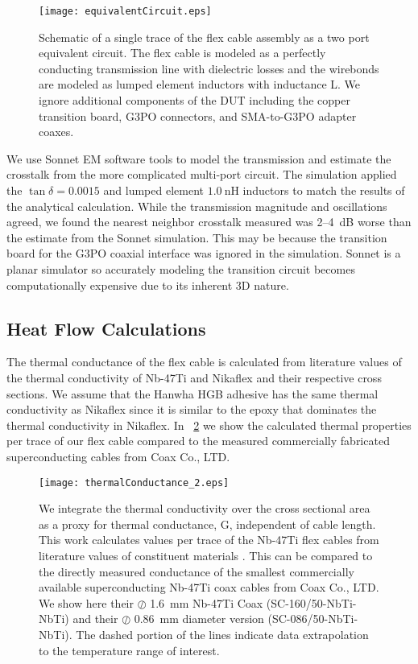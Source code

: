 \begin{figure}[!t]
    \centering
      \texttt{[image: equivalentCircuit.eps]}
    \caption[Equivalent circuit for flex cable]{Schematic of a single trace of the flex cable assembly as a two port equivalent circuit. The flex cable is modeled as a perfectly conducting transmission line with dielectric losses and the wirebonds are modeled as lumped element inductors with inductance L. We ignore additional components of the DUT including the copper transition board, G3PO connectors, and SMA-to-G3PO adapter coaxes.}
    \label{fig:Circuit}
\end{figure}

We use Sonnet EM software tools to model the transmission and estimate the crosstalk from the more complicated multi-port circuit. The simulation applied the $\tan{\delta} =0.0015$ and lumped element $1.0~\textrm{nH}$ inductors to match the results of the analytical calculation. While the transmission magnitude and oscillations agreed, we found the nearest neighbor crosstalk measured was 2--4~dB worse than the estimate from the Sonnet simulation. This may be because the transition board for the G3PO coaxial interface was ignored in the simulation. Sonnet is a planar simulator so accurately modeling the transition circuit becomes computationally expensive due to its inherent 3D nature. 

\subsection{Heat Flow Calculations} \label{sec:thermal}
The thermal conductance of the flex cable is calculated from literature values of the thermal conductivity of Nb-47Ti \parencite{DaalInPrep, Olson1993} and Nikaflex \parencite{Kellaris} and their respective cross sections. We assume that the Hanwha HGB adhesive has the same thermal conductivity as Nikaflex since it is similar to the epoxy that dominates the thermal conductivity in Nikaflex. In \figurename~\ref{fig:Heat} we show the calculated thermal properties per trace of our flex cable compared to the measured commercially fabricated superconducting cables from Coax Co., LTD. 

\begin{figure}[!t]
    \centering
      \texttt{[image: thermalConductance\_2.eps]}
    \caption[Thermal conductivity of flex cable]{We integrate the thermal conductivity over the cross sectional area as a proxy for thermal conductance, G, independent of cable length. This work calculates values per trace of the Nb-47Ti flex cables from literature values of constituent materials \parencite{DaalInPrep, Olson1993, Kellaris}. This can be compared to the directly measured conductance of the smallest commercially available superconducting Nb-47Ti coax cables from Coax Co., LTD. We show here their $\oslash$ 1.6~mm Nb-47Ti Coax (SC-160/50-NbTi-NbTi)\parencite{Kushino} and their $\oslash$ 0.86~mm diameter version (SC-086/50-NbTi-NbTi)\parencite{Kushino2016}. The dashed portion of the lines indicate data extrapolation to the temperature range of interest.}
    \label{fig:Heat}
\end{figure}


